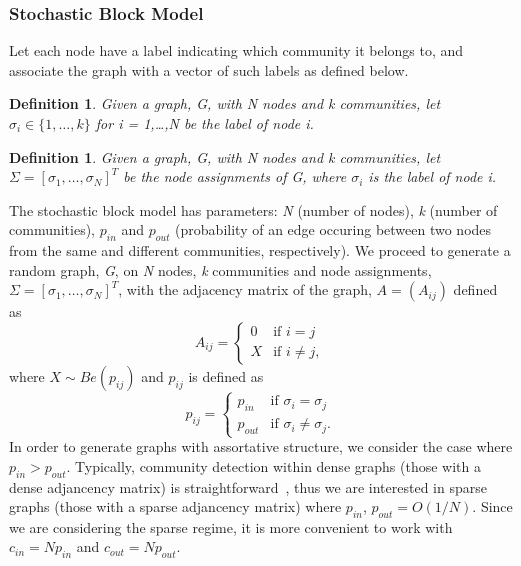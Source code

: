 \documentclass[12pt]{article}
\numberwithin{equation}{section}
\newtheorem{definition}[theorem]{Definition}
\begin{document}
\subsubsection{Stochastic Block Model}
\label{sec:background;subsec:communityDetection;subsubsec:stochasticBlockModel}

Let each node have a label indicating which community it belongs to, and associate the graph with a vector of such labels as defined below.

\begin{definition}
\label{def:nodeLabel}
Given a graph, G, with N nodes and k communities, let $\sigma_{i} \in \{1,\dots,k\}$ for i = 1,\dots,N be the label of node i.
\end{definition}

\begin{definition}
\label{def:nodeAssignments}
Given a graph, G, with N nodes and k communities, let $\Sigma = [\sigma_{1},\dots,\sigma_{N}]^{T}$ be the node assignments of G, where $\sigma_{i}$ is the label of node i.
\end{definition}
 
The stochastic block model has parameters: \textsl{N} (number of nodes), \textsl{k} (number of communities), \textsl{$p_{in}$} and \textsl{$p_{out}$} (probability of an edge occuring between two nodes from the same and different communities, respectively). We proceed to generate a random graph, \textsl{G}, on \textsl{N} nodes, \textsl{k} communities and node assignments, \textsl{$\Sigma = [\sigma_{1},\dots,\sigma_{N}]^{T}$}, with the adjacency matrix of the graph, \textsl{$A = (A_{ij})$} defined as
\begin{equation*}
 A_{ij} =
  \begin{cases}
   0 & \text{if } i = j\\
   X & \text{if } i \neq j,
  \end{cases}
\end{equation*}
where $X \sim Be(p_{ij})$ and \textsl{$p_{ij}$} is defined as
\begin{equation*}
 p_{ij} =
  \begin{cases}
   p_{in} & \text{if } \sigma_{i} = \sigma_{j}\\
   p_{out} & \text{if } \sigma_{i} \neq \sigma_{j}.
  \end{cases}
\end{equation*}
In order to generate graphs with assortative structure, we consider the case where $p_{in} > p_{out}$. Typically, community detection within dense graphs (those with a dense adjancency matrix) is straightforward~\cite{DKM+13}, thus we are interested in sparse graphs (those with a sparse adjancency matrix) where $p_{in}$, $p_{out} = O(1/N)$. Since we are considering the sparse regime, it is more convenient to work with $c_{in} = Np_{in}$ and $c_{out} = Np_{out}$.
\end{document}
